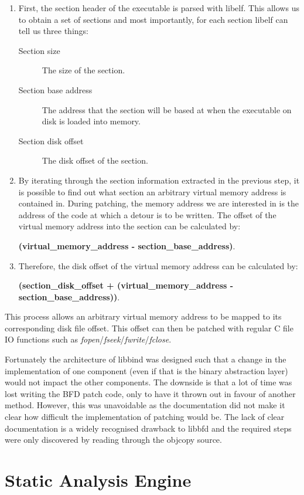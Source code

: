\begin{enumerate}
\item First, the section header of the executable is parsed with libelf. This allows us to obtain a set of sections and most importantly, for each section libelf can tell us three things:
  \begin{description}
  \item [Section size] The size of the section.
  \item [Section base address] The address that the section will be based at when the executable on disk is loaded into memory.
  \item [Section disk offset] The disk offset of the section.
  \end{description}
\item By iterating through the section information extracted in the previous step, it is possible to find out what section an arbitrary virtual memory address is contained in. During patching, the memory address we are interested in is the address of the code at which a detour is to be written. The offset of the virtual memory address into the section can be calculated by:

\textbf{(virtual\_memory\_address - section\_base\_address)}.
\item Therefore, the disk offset of the virtual memory address can be calculated by:

\textbf{(section\_disk\_offset + (virtual\_memory\_address - section\_base\_address))}.
\end{enumerate}

This process allows an arbitrary virtual memory address to be mapped to its corresponding disk file offset. This offset can then be patched with regular C file IO functions such as \emph{fopen}/\emph{fseek}/\emph{fwrite}/\emph{fclose}.

Fortunately the architecture of libbind was designed such that a change in the implementation of one component (even if that is the binary abstraction layer) would not impact the other components. The downside is that a lot of time was lost writing the BFD patch code, only to have it thrown out in favour of another method. However, this was unavoidable as the documentation did not make it clear how difficult the implementation of patching would be. The lack of clear documentation is a widely recognised drawback to libbfd and the required steps were only discovered by reading through the objcopy source.

\section{Static Analysis Engine}

